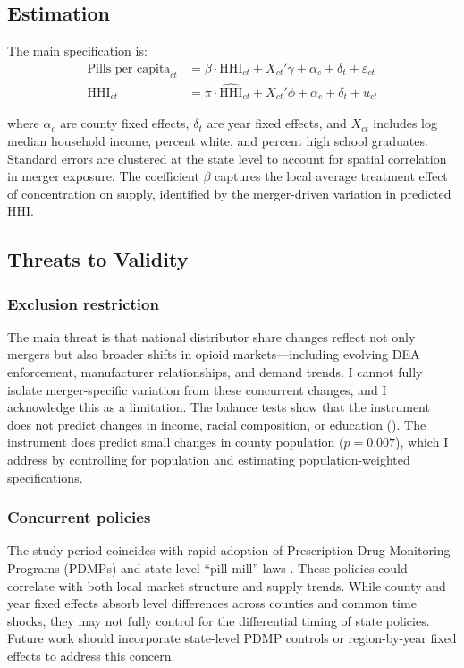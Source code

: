 \documentclass[12pt]{article}
\begin{document}
\subsection{Estimation}

The main specification is:
\begin{align}
\text{Pills per capita}_{ct} &= \beta \cdot \text{HHI}_{ct} + X_{ct}'\gamma + \alpha_c + \delta_t + \varepsilon_{ct} \label{eq:second} \\
\text{HHI}_{ct} &= \pi \cdot \widehat{\text{HHI}}_{ct} + X_{ct}'\phi + \alpha_c + \delta_t + u_{ct} \label{eq:first}
\end{align}

where $\alpha_c$ are county fixed effects, $\delta_t$ are year fixed effects, and $X_{ct}$ includes log median household income, percent white, and percent high school graduates. Standard errors are clustered at the state level to account for spatial correlation in merger exposure. The coefficient $\beta$ captures the local average treatment effect of concentration on supply, identified by the merger-driven variation in predicted HHI.

\subsection{Threats to Validity}

\subsubsection*{Exclusion restriction} The main threat is that national distributor share changes reflect not only mergers but also broader shifts in opioid markets---including evolving DEA enforcement, manufacturer relationships, and demand trends. I cannot fully isolate merger-specific variation from these concurrent changes, and I acknowledge this as a limitation. The balance tests show that the instrument does not predict changes in income, racial composition, or education (). The instrument does predict small changes in county population ($p = 0.007$), which I address by controlling for population and estimating population-weighted specifications.

\subsubsection*{Concurrent policies} The study period coincides with rapid adoption of Prescription Drug Monitoring Programs (PDMPs) and state-level ``pill mill'' laws \citep{buchmueller2020effect, meara2016state}. These policies could correlate with both local market structure and supply trends. While county and year fixed effects absorb level differences across counties and common time shocks, they may not fully control for the differential timing of state policies. Future work should incorporate state-level PDMP controls or region-by-year fixed effects to address this concern.
\end{document}
